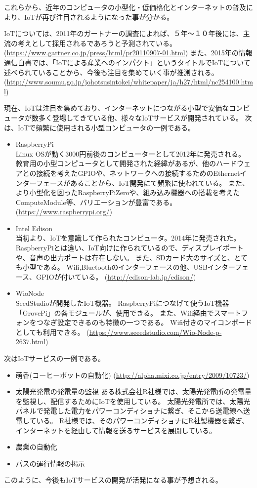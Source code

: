 これらから、近年のコンピュータの小型化・低価格化とインターネットの普及により、IoTが再び注目されるようになった事が分かる。


IoTについては、2011年のガートナーの調査によれば、５年〜１０年後には、主流の考えとして採用されるであろうと予測されている。
(\url{https://www.gartner.co.jp/press/html/pr20110907-01.html})
また、2015年の情報通信白書では、「IoTによる産業へのインパクト」というタイトルでIoTについて述べられていることから、今後も注目を集めていく事が推測される。
(\url{http://www.soumu.go.jp/johotsusintokei/whitepaper/ja/h27/html/nc254100.html})

現在、IoTは注目を集めており、インターネットにつながる小型で安価なコンピュータが数多く登場してきている他、様々なIoTサービスが開発されている。
次は、IoTで頻繁に使用される小型コンピュータの一例である。
\begin{itemize}
\item RaspberryPi\\
	Linux OSが動く3000円前後のコンピューターとして2012年に発売される。
	教育用の小型コンピュータとして開発された経緯があるが、他のハードウェアとの接続を考えたGPIOや、ネットワークへの接続するためのEthernetインターフェースがあることから、IoT開発にて頻繁に使われている。
	また、より小型化を図ったRaspberryPiZeroや、組み込み機器への搭載を考えたComputeModule等、バリエーションが豊富である。
	(\url{https://www.raspberrypi.org/})
\item Intel Edison\\
	当初より、IoTを意識して作られたコンピュータ。2014年に発売された。
	RaspberryPiとは違い、IoT向けに作られているので、ディスプレイポートや、音声の出力ポートは存在しない。
	また、SDカード大のサイズと、とても小型である。
	Wifi,Bluetoothのインターフェースの他、USBインターフェース、GPIOが付いている。
	(\url{http://edison-lab.jp/edison/})
\item WioNode\\
	SeedStudioが開発したIoT機器。
	RaspberryPiにつなげて使うIoT機器「GrovePi」の各モジュールが、使用できる。
	また、Wifi経由でスマートフォンをつなぎ設定できるのも特徴の一つである。
	Wifi付きのマイコンボードとしても利用できる。
	(\url{https://www.seeedstudio.com/Wio-Node-p-2637.html})
\end{itemize}

次はIoTサービスの一例である。
\begin{itemize}
\item 萌香(コーヒーポットの自動化)
	(\url{http://alpha.mixi.co.jp/entry/2009/10723/})
\item 太陽光発電の発電量の監視
	ある株式会社R社様では、太陽光発電所の発電量を監視し、配信するためにIoTを使用している。
	太陽光発電所では、太陽光パネルで発電した電力をパワーコンディショナに繋ぎ、そこから送電線へ送電している。
	R社様では、そのパワーコンディショナにR社製機器を繋ぎ、インターネットを経由して情報を送るサービスを展開している。
\item 農業の自動化
	
\item パスの運行情報の掲示

\end{itemize}
このように、今後もIoTサービスの開発が活発になる事が予想される。

